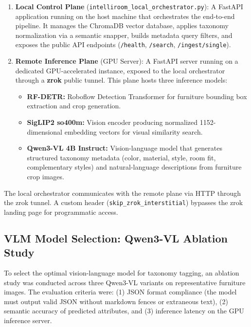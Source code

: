 \begin{enumerate}
    \item \textbf{Local Control Plane} (\texttt{intelliroom\_local\_orchestrator.py}): A FastAPI application running on the host machine that orchestrates the end-to-end pipeline. It manages the ChromaDB vector database, applies taxonomy normalization via a semantic snapper, builds metadata query filters, and exposes the public API endpoints (\texttt{/health}, \texttt{/search}, \texttt{/ingest/single}).
    
    \item \textbf{Remote Inference Plane} (GPU Server): A FastAPI server running on a dedicated GPU-accelerated instance, exposed to the local orchestrator through a \textbf{zrok} public tunnel. This plane hosts three inference models:
    \begin{itemize}
        \item \textbf{RF-DETR:} Roboflow Detection Transformer for furniture bounding box extraction and crop generation.
        \item \textbf{SigLIP2 so400m:} Vision encoder producing normalized 1152-dimensional embedding vectors for visual similarity search.
        \item \textbf{Qwen3-VL 4B Instruct:} Vision-language model that generates structured taxonomy metadata (color, material, style, room fit, complementary styles) and natural-language descriptions from furniture crop images.
    \end{itemize}
\end{enumerate}

The local orchestrator communicates with the remote plane via HTTP through the zrok tunnel. A custom header (\texttt{skip\_zrok\_interstitial}) bypasses the zrok landing page for programmatic access.

\subsection{VLM Model Selection: Qwen3-VL Ablation Study}
\label{subsec:vlm_selection}

To select the optimal vision-language model for taxonomy tagging, an ablation study was conducted across three Qwen3-VL variants on representative furniture images. The evaluation criteria were: (1) JSON format compliance (the model must output valid JSON without markdown fences or extraneous text), (2) semantic accuracy of predicted attributes, and (3) inference latency on the GPU inference server.

